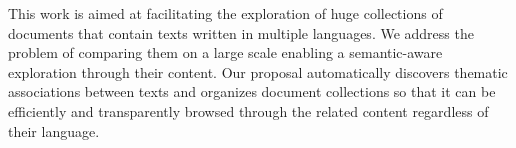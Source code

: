 This work is aimed at facilitating the exploration of huge collections of documents that contain texts written in multiple languages. We address the problem of comparing them on a large scale enabling a semantic-aware exploration through their content. Our proposal automatically discovers thematic associations between texts and organizes document collections so that it can be efficiently and transparently browsed through the related content regardless of their language.











